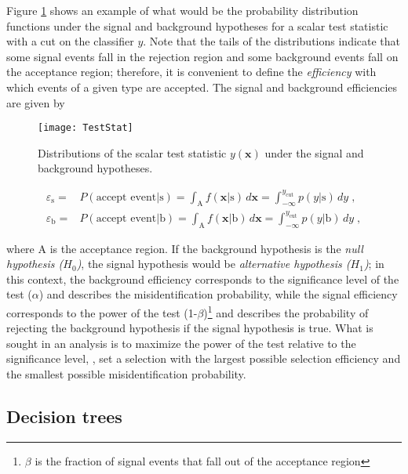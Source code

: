 Figure \ref{fig:scalar_test} shows an example of what would be the probability distribution functions under the signal and background hypotheses for a scalar test statistic with a cut on the classifier $y$.
Note that the tails of the distributions indicate that some signal events fall in the rejection region and some background events fall on the acceptance region; therefore, it is convenient to define the \textit{efficiency} with which events of a given type are accepted. The signal and background efficiencies are given by 

\begin{figure}[!h]
  \centering
  \texttt{[image: TestStat]}
  \caption[Scalar test statistical.]{Distributions of the scalar test statistic $y(\textbf{x})$ under the signal and background hypotheses.\cite{mva}}\label{fig:scalar_test}
\end{figure}

\begin{align}
\label{eq:sigeff}
\varepsilon_{\textrm{s}}  = & P( \mbox{accept event} | \mbox{s} ) = \int_{\textrm{A}} f(\textbf{x} | \mbox{s} ) \, d \textbf{x} = \int_{-\infty}^{y_{\textrm{cut}}} p(y | \mbox{s}) \, dy\;, \\
\varepsilon_{\textrm{b}}  = & P( \mbox{accept event} | \mbox{b} ) = \int_{\textrm{A}} f(\textbf{x} | \mbox{b} ) \, d \textbf{x} = \int_{-\infty}^{y_{\textrm{cut}}} p(y | \mbox{b}) \, dy \;,
\end{align}

\noindent where A is the acceptance region. If the background hypothesis is the \textit{null hypothesis ($H_0$)}, the signal hypothesis would be \textit{alternative hypothesis ($H_1$)}; in this context, the background efficiency corresponds to the significance level of the test ($\alpha$) and describes the misidentification probability, while the signal efficiency corresponds to the power of the test (1-$\beta$)\footnote{$\beta$ is the fraction of signal events that fall out of the acceptance region} and describes the probability of rejecting the background hypothesis if the signal hypothesis is true. What is sought in an analysis is to maximize the power of the test relative to the significance level, \ie, set a selection with the largest possible selection efficiency and the smallest possible misidentification probability.

\subsection{Decision trees}\label{subsec:dt}

